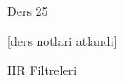 \documentclass[12pt,fleqn]{article}\usepackage{../../common}
\begin{document}
Ders 25

[ders notlari atlandi]

IIR Filtreleri
\end{document}
